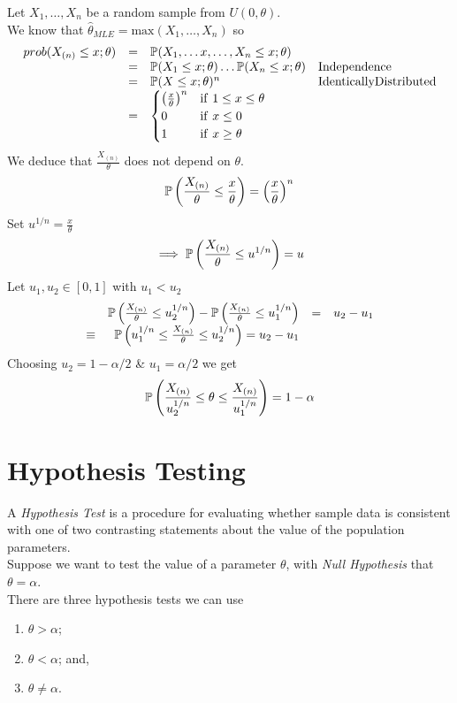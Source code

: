 \documentclass[11pt,a4paper]{article}
\begin{document}
Let $X_1,\dots,X_n$ be a random sample from $U(0,\theta)$.\\
We know that $\hat{\theta}_{MLE}=\mathrm{max}(X_1,\dots,X_n)$ so
\[\begin{array}{rcll}
prob(X_{(n)}\leq x;\theta)&=&\mathbb{P}(X_1,\dots x,\dots,X_n\leq x;\theta)\\
&=&\mathbb{P}(X_1\leq x;\theta)\dots\mathbb{P}(X_n\leq x;\theta)&\mathrm{Independence}\\
&=&\mathbb{P}(X\leq x;\theta)^n&\mathrm{Identically Distributed}\\
&=&\begin{cases}
\left(\frac{x}{\theta}\right)^n&\mathrm{if\ }1\leq x\leq\theta\\
0&\mathrm{if\ }x\leq0\\
1&\mathrm{if\ }x\geq\theta
\end{cases}
\end{array}\]
We deduce that $\frac{X_{(n)}}{\theta}$ does not depend on $\theta$.\\
$$\mathbb{P}\left(\frac{X_{(n)}}{\theta}\leq\frac{x}{\theta}\right)=\left(\frac{x}{\theta}\right)^n$$
Set $u^{1/n}=\frac{x}{\theta}$
$$\implies\mathbb{P}\left(\frac{X_{(n)}}{\theta}\leq u^{1/n}\right)=u$$
Let $u_1,u_2\in[0,1]$ with $u_1<u_2$
\[\begin{array}{rrcl}
&\mathbb{P}\left(\frac{X_{(n)}}{\theta}\leq u_2^{1/n}\right)-\mathbb{P}\left(\frac{X_{(n)}}{\theta}\leq u_1^{1/n}\right)&=&u_2-u_1\\
\equiv&\mathbb{P}\left(u_1^{1/n}\leq\frac{X_{(n)}}{\theta}\leq u_2^{1/n}\right)=u_2-u_1
\end{array}\]
Choosing $u_2=1-\alpha/2$ \& $u_1=\alpha/2$ we get
$$\mathbb{P}\left(\frac{X_{(n)}}{u_2^{1/n}}\leq\theta\leq\frac{X_{(n)}}{u_1^{1/n}}\right)=1-\alpha$$


\section{Hypothesis Testing}

A \textit{Hypothesis Test} is a procedure for evaluating whether sample data is consistent with one of two contrasting statements about the value of the population parameters.\\

Suppose we want to test the value of a parameter $\theta$, with \textit{Null Hypothesis} that $\theta=\alpha$.\\
There are three hypothesis tests we can use
\begin{enumerate}[label=\roman*)]
	\item $\theta>\alpha$;
	\item $\theta<\alpha$; and,
	\item $\theta\neq\alpha$.
\end{enumerate}
\end{document}

